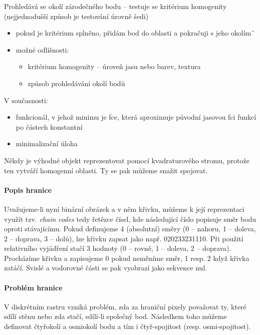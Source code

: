 Prohledává se okolí zárodečného bodu -- testuje se kritérium homogenity (nejjednodušší způsob je testování úrovně šedi)
\begin{itemize}
	\item pokud je kritérium splněno, přidám bod do oblasti a pokračuji s jeho okolímˇ
	\item možné odlišnosti:
\begin{itemize}
	\item kritérium homogenity -- úroveň jasu nebo barev, textura
	\item způsob prohledávání okolí bodů
\end{itemize}
\end{itemize}
V současnosti:
\begin{itemize}
	\item funkcionál, v jehož minimu je fce, která aproximuje původní jasovou fci funkcí po částech konstantní
	\item minimalizační úloha
\end{itemize}

Někdy je výhodné objekt reprezentovat pomocí kvadraturového stromu, protože ten vytváří
homogenní oblasti. Ty se pak můžeme snažit spojovat.

\paragraph{Popis hranice}
Uvažujeme-li nyní binární obrázek a v něm křivku, můžeme k její reprezentaci využít tzv. \emph{chain codes} tedy
řetězce čísel, kde následující číslo popisuje směr bodu oproti stávajícímu. Pokud definujeme 4 (absolutní) směry
(0 -- nahoru, 1 -- doleva, 2 -- doprava, 3 -- dolů), lze křivku zapsat jako např. 020233231110. Při použití 
relativního vyjádření stačí 3 hodnoty (0 -- rovně, 1 -- doleva, 2 -- doprava). Procházíme křivku a zapisujeme
0 pokud neměníme směr, 1 resp. 2 když křivka zatáčí. Svislé a vodorovné části se pak vyobrazí jako sekvence nul.

\paragraph{Problém hranice}
V diskrétním rastru vzniká problém, zda za hraniční pixely považovat ty, které sdílí stěnu nebo zda stačí, sdílí-li 
společný bod. Následkem toho můžeme definovat čtyřokolí a osmiokolí bodu a tím i čtyř-spojitost (resp. osmi-spojitost).

